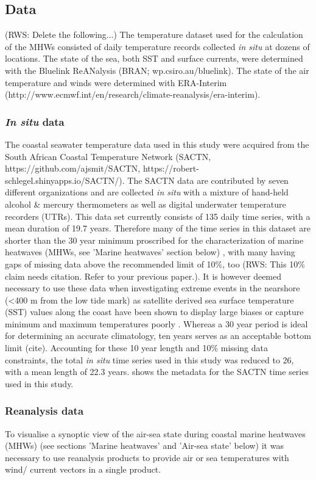 \documentclass[a4paper,10pt,review]{elsarticle}
\begin{document}
\subsection{Data}

(RWS: Delete the following...)
The temperature dataset used for the calculation of the MHWs consisted of daily temperature records collected \emph{in situ} at dozens of locations. The state of the sea, both SST and surface currents, were determined with the Bluelink ReANalysis (BRAN; wp.csiro.au/bluelink). The state of the air temperature and winds were determined with ERA-Interim (http://www.ecmwf.int/en/research/climate-reanalysis/era-interim).

\subsubsection{\emph{In situ} data}
The coastal seawater temperature data used in this study were acquired from the South African Coastal Temperature Network (SACTN, https://github.com/ajsmit/SACTN, https://robert-schlegel.shinyapps.io/SACTN/). The SACTN data are contributed by seven different organizations and are collected \emph{in situ} with a mixture of hand-held alcohol \& mercury thermometers as well as digital underwater temperature recorders (UTRs). This data set currently consists of 135 daily time series, with a mean duration of 19.7 years. Therefore many of the time series in this dataset are shorter than the 30 year minimum proscribed for the characterization of marine heatwaves (MHWs, see 'Marine heatwaves' section below) \citep{Hobday2016}, with many having gaps of missing data above the recommended limit of 10\%, too (RWS: This 10\% claim needs citation. Refer to your previous paper.). It is however deemed necessary to use these data when investigating extreme events in the nearshore (<400 m from the low tide mark) as satellite derived sea surface temperature (SST) values along the coast have been shown to display large biases \citep{Smit2013} or capture minimum and maximum temperatures poorly \citep{Smale2009, Castillo2010}. Whereas a 30 year period is ideal for determining an accurate climatology, ten years serves as an acceptable bottom limit (cite). Accounting for these 10 year length and 10\% missing data constraints, the total \emph{in situ} time series used in this study was reduced to 26, with a mean length of 22.3 years.  shows the metadata for the SACTN time series used in this study.

\subsubsection{Reanalysis data}
To visualise a synoptic view of the air-sea state during coastal marine heatwaves (MHWs) (see sections 'Marine heatwaves' and 'Air-sea state' below) it was necessary to use reanalysis products to provide air or sea temperatures with wind/ current vectors in a single product.
\end{document}
